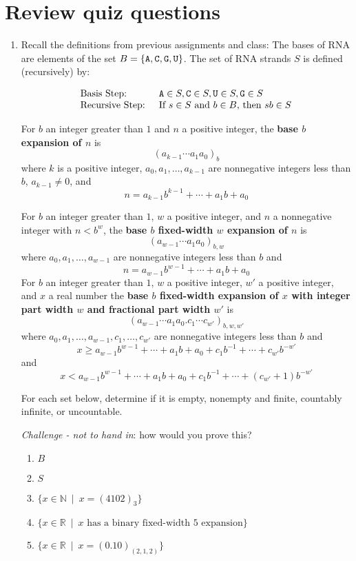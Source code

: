 \documentclass[12pt, oneside]{article}
\begin{document}
\vfill
\newpage

\section*{Review quiz questions}
\begin{enumerate}
\item Recall the definitions from previous assignments and class: 
The bases of RNA are elements of the set 
$B  = \{\texttt{A}, \texttt{C}, \texttt{G}, \texttt{U} \}$. The set of RNA strands $S$ is defined (recursively) by:

\[
\begin{array}{ll}
\textrm{Basis Step: } & \texttt{A} \in S, \texttt{C} \in S, \texttt{U} \in S, \texttt{G} \in S \\
\textrm{Recursive Step: } & \textrm{If } s \in S\textrm{ and }b \in B \textrm{, then }sb \in S
\end{array}
\]

For $b$ an integer greater than $1$ and $n$ a positive integer, 
the {\bf base $b$ expansion of $n$}  is
\[
(a_{k-1} \cdots a_1 a_0)_b
\]
where $k$ is a positive integer, $a_0, a_1, \ldots, a_{k-1}$ are nonnegative integers less than $b$, $a_{k-1} \neq  0$, and
\[
n =  a_{k-1} b^{k-1} + \cdots + a_1b + a_0
\]

For $b$ an integer greater than $1$, $w$ a positive integer, and $n$ a nonnegative integer
with $n < b^w$,
the {\bf base $b$ fixed-width $w$ expansion of $n$}  is
\[
(a_{w-1} \cdots a_1 a_0)_{b,w}
\]
where  $a_0, a_1, \ldots, a_{w-1}$ are nonnegative integers less than $b$ and
\[
n =  a_{w-1} b^{w-1} + \cdots + a_1b + a_0
\]
For $b$ an integer greater than $1$, $w$ a positive integer, $w'$ a positive  integer, and $x$ a real number
the {\bf base $b$ fixed-width expansion of $x$ with integer part width $w$  and fractional part width $w'$} is
\[
(a_{w-1} \cdots a_1 a_0 .  c_{1} \cdots c_{w'})_{b,w,w'}
\]
where  $a_0, a_1, \ldots, a_{w-1}, c_1, \ldots, c_{w'}$ are nonnegative integers less than $b$ and
$$x \geq a_{w-1} b^{w-1} +  \cdots + a_1 b + a_0 +  c_{1} b^{-1} + \cdots +  c_{w'} b^{-w'}$$
and
$$x < a_{w-1} b^{w-1} +  \cdots + a_1 b + a_0 +  c_{1} b^{-1} + \cdots +  (c_{w'} +1) b^{-w'}$$


For each set below, determine if it is empty, nonempty and finite, countably infinite, or uncountable.

{\it Challenge - not to hand in}: how would you prove this?

\begin{enumerate}
\item $B$
\item $S$
\item $\{ x \in \mathbb{N} ~\mid~ x = (4102)_3 \}$
\item $\{ x \in \mathbb{R} ~\mid~ \text{$x$ has a binary fixed-width $5$ expansion} \}$
\item $\{ x \in \mathbb{R} ~\mid~ x = (0.10)_{(2,1,2)} \}$
\end{enumerate}


\end{enumerate}
\end{document}
